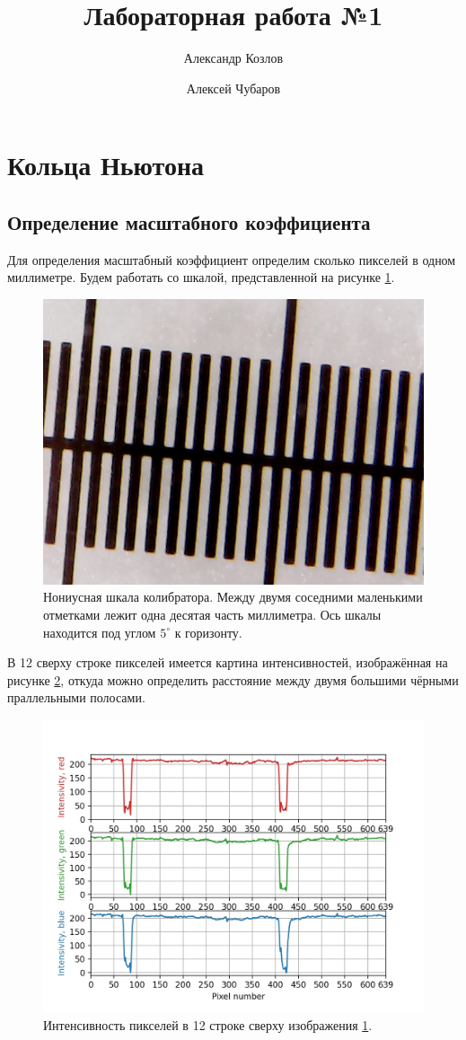 \documentclass[12pt]{article}
\title{Лабораторная работа №1}
\author{Александр Козлов\and Алексей Чубаров}
\date{}
\begin{document}
\maketitle

\section{Кольца Ньютона}
\subsection{Определение масштабного коэффициента}
Для определения масштабный коэффициент определим сколько пикселей в одном миллиметре. Будем работать со шкалой, представленной на рисунке \ref{fig:1}. 
\begin{figure}[htbp]
	\centering
	\includegraphics[width = 0.5\linewidth]{data/1-0.jpg}
	\caption{Нониусная шкала колибратора. Между двумя соседними маленькими отметками лежит одна десятая часть миллиметра. Ось шкалы находится под углом $5^\circ$ к горизонту.}
	\label{fig:1}
\end{figure}
В 12 сверху строке пикселей имеется картина интенсивностей, изображённая на рисунке \ref{fig:2}, откуда можно определить расстояние между двумя большими чёрными праллельными полосами.
\begin{figure}[htbp]
	\centering
	\includegraphics[scale = 1]{plots/1-0.jpg}
	\caption{Интенсивность пикселей в 12 строке сверху изображения \ref{fig:1}.}
	\label{fig:2}
\end{figure}
\end{document}
